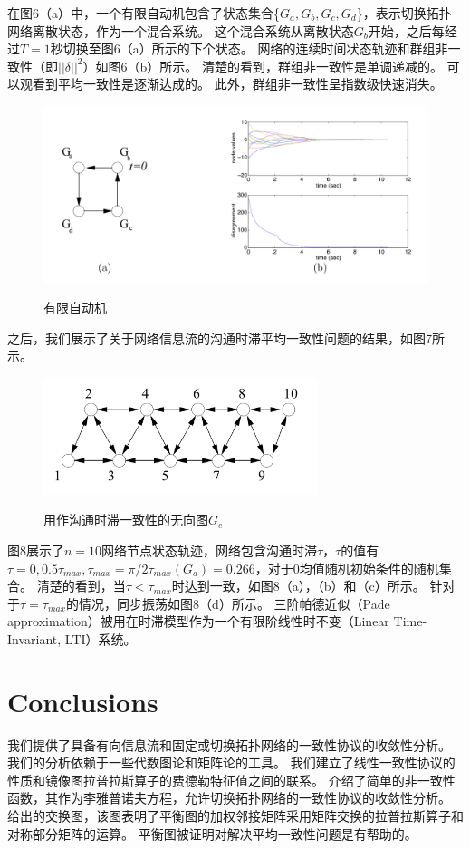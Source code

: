 \documentclass{article}
\begin{document}
在图6（a）中，一个有限自动机包含了状态集合\{$G_a, G_b, G_c, G_d$\}，表示切换拓扑网络离散状态，作为一个混合系统。
这个混合系统从离散状态$G_b$开始，之后每经过$T=1$秒切换至图6（a）所示的下个状态。
网络的连续时间状态轨迹和群组非一致性（即$||\delta||^2$）如图6（b）所示。
清楚的看到，群组非一致性是单调递减的。
可以观看到平均一致性是逐渐达成的。
此外，群组非一致性呈指数级快速消失。
\begin{figure}[htbp]
    \centering
    \includegraphics[width=14.5cm]{figures/Fig6-Automaton.jpeg}
    \label{Automaton}
    \caption{有限自动机}
\end{figure}

之后，我们展示了关于网络信息流的沟通时滞平均一致性问题的结果，如图7所示。
\begin{figure}[htbp]
    \centering
    \includegraphics[width=8cm]{figures/Fig7-Undirected.jpeg}
    \label{Undirected}
    \caption{用作沟通时滞一致性的无向图$G_e$}
\end{figure}

图8展示了$n=10$网络节点状态轨迹，网络包含沟通时滞$\tau$，$\tau$的值有$\tau=0, 0.5\tau_{max}, \tau_{max} = \pi / 2\tau_{max}(G_a) = 0.266$，对于0均值随机初始条件的随机集合。
清楚的看到，当$\tau < \tau_{max}$时达到一致，如图8（a），（b）和（c）所示。
针对于$\tau = \tau_{max}$的情况，同步振荡如图8（d）所示。
三阶帕德近似（Pade approximation）被用在时滞模型作为一个有限阶线性时不变（Linear Time-Invariant, LTI）系统。


\section{Conclusions}
我们提供了具备有向信息流和固定或切换拓扑网络的一致性协议的收敛性分析。
我们的分析依赖于一些代数图论和矩阵论的工具。
我们建立了线性一致性协议的性质和镜像图拉普拉斯算子的费德勒特征值之间的联系。
介绍了简单的非一致性函数，其作为李雅普诺夫方程，允许切换拓扑网络的一致性协议的收敛性分析。
给出的交换图，该图表明了平衡图的加权邻接矩阵采用矩阵交换的拉普拉斯算子和对称部分矩阵的运算。
平衡图被证明对解决平均一致性问题是有帮助的。
\end{document}
